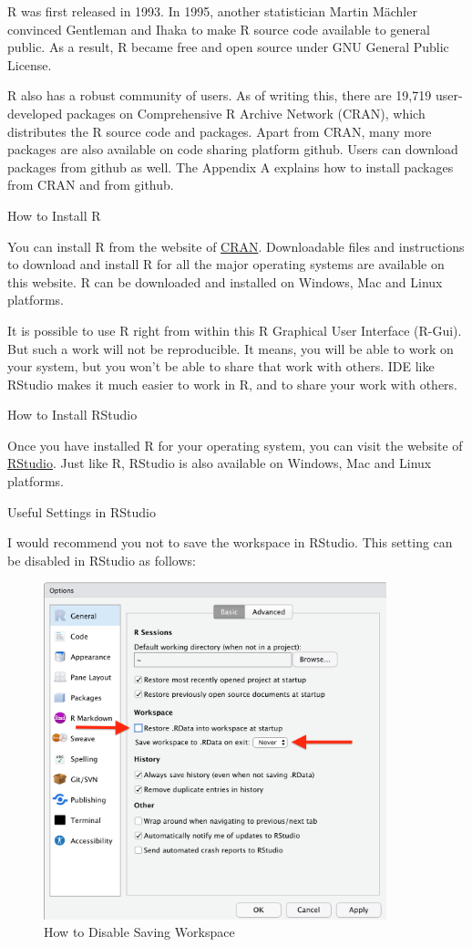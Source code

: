 \documentclass[
  letterpaper,
  paper =a4,
  twoside,
  openright,
  headsepline,
  footsepline,
  listof = totocnumbered,
  chapterprefix = true,
  firstiscover]{scrbook}
\begin{document}
R was first released in 1993. In 1995, another statistician Martin
Mächler convinced Gentleman and Ihaka to make R source code available to
general public. As a result, R became free and open source under GNU
General Public License.

R also has a robust community of users. As of writing this, there are
19,719 user-developed packages on Comprehensive R Archive Network
(CRAN), which distributes the R source code and packages. Apart from
CRAN, many more packages are also available on code sharing platform
github. Users can download packages from github as well. The Appendix A
explains how to install packages from CRAN and from github.

How to Install R

You can install R from the website of
\href{https://cran.r-project.org/}{CRAN}. Downloadable files and
instructions to download and install R for all the major operating
systems are available on this website. R can be downloaded and installed
on Windows, Mac and Linux platforms.

It is possible to use R right from within this R Graphical User
Interface (R-Gui). But such a work will not be reproducible. It means,
you will be able to work on your system, but you won't be able to share
that work with others. IDE like RStudio makes it much easier to work in
R, and to share your work with others.

How to Install RStudio

Once you have installed R for your operating system, you can visit the
website of \href{https://posit.co/download/rstudio-desktop/}{RStudio}.
Just like R, RStudio is also available on Windows, Mac and Linux
platforms.

Useful Settings in RStudio

I would recommend you not to save the workspace in RStudio. This setting
can be disabled in RStudio as follows:

\begin{figure}

{\centering \includegraphics[width=3.92in,height=\textheight]{images/RStudio-settings.png}

}

\caption{\label{fig-disable-workspace}How to Disable Saving Workspace}

\end{figure}
\end{document}
